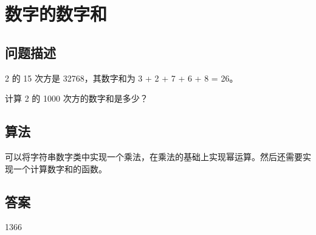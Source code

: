 \section{数字的数字和}
\subsection{问题描述}
\begin{tcolorbox}
2 的 15 次方是 32768，其数字和为 3 + 2 + 7 + 6 + 8 = 26。

计算 2 的 1000 次方的数字和是多少？
\end{tcolorbox}

\subsection{算法}
可以将字符串数字类中实现一个乘法，在乘法的基础上实现幂运算。然后还需要实现一个计算数字和的函数。

\subsection{答案}
1366

